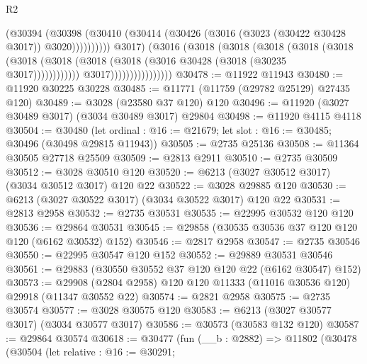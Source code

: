\begin{lexlean}{R2}
\begin{coremodule}
                                            (@30394
                                              (@30398
                                                (@30410
                                                  (@30414
                                                    (@30426
                                                      (@3016
                                                        (@3023 (@30422 @30428 @3017))
                                                        @3020))))))))))
                                    @3017)
                                  (@3016
                                    (@3018
                                      (@3018
                                        (@3018
                                          (@3018
                                            (@3018
                                              (@3018
                                                (@3018
                                                  (@3018
                                                    (@3018
                                                      (@3016 @30428 (@3018 (@30235 @3017))))))))))))
                                    @3017))))))))))))))))
@30478 := @11922 @11943
@30480 := @11920 @30225 @30228
@30485 := @11771 (@11759 (@29782 @25129) @27435 @120)
@30489 := @3028 (@23580 @37 @120) @120
@30496 := @11920 (@3027 @30489 @3017) (@3034 @30489 @3017) @29804
@30498 := @11920 @4115 @4118
@30504 := @30480
    (let ordinal : @16 := @21679; let slot : @16 := @30485; @30496 (@30498 @29815 @11943))
@30505 := @2735 @25136
@30508 := @11364 @30505 @27718 @25509
@30509 := @2813 @2911
@30510 := @2735 @30509
@30512 := @3028 @30510 @120
@30520 := @6213 (@3027 @30512 @3017) (@3034 @30512 @3017) @120 @22
@30522 := @3028 @29885 @120
@30530 := @6213 (@3027 @30522 @3017) (@3034 @30522 @3017) @120 @22
@30531 := @2813 @2958
@30532 := @2735 @30531
@30535 := @22995 @30532 @120 @120
@30536 := @29864 @30531
@30545 := @29858 (@30535 @30536 @37 @120 @120 @120 (@6162 @30532) @152)
@30546 := @2817 @2958
@30547 := @2735 @30546
@30550 := @22995 @30547 @120 @152
@30552 := @29889 @30531 @30546
@30561 := @29883 (@30550 @30552 @37 @120 @120 @22 (@6162 @30547) @152)
@30573 := @29908 (@2804 @2958) @120 @120 @11333 (@11016 @30536 @120) @29918 (@11347 @30552 @22)
@30574 := @2821 @2958
@30575 := @2735 @30574
@30577 := @3028 @30575 @120
@30583 := @6213 (@3027 @30577 @3017) (@3034 @30577 @3017)
@30586 := @30573 (@30583 @132 @120)
@30587 := @29864 @30574
@30618 := @30477
    (fun (__b : @2882) =>
    @11802
      (@30478
        (@30504
          (let relative : @16 := @30291;

\end{coremodule}
\end{lexlean}

